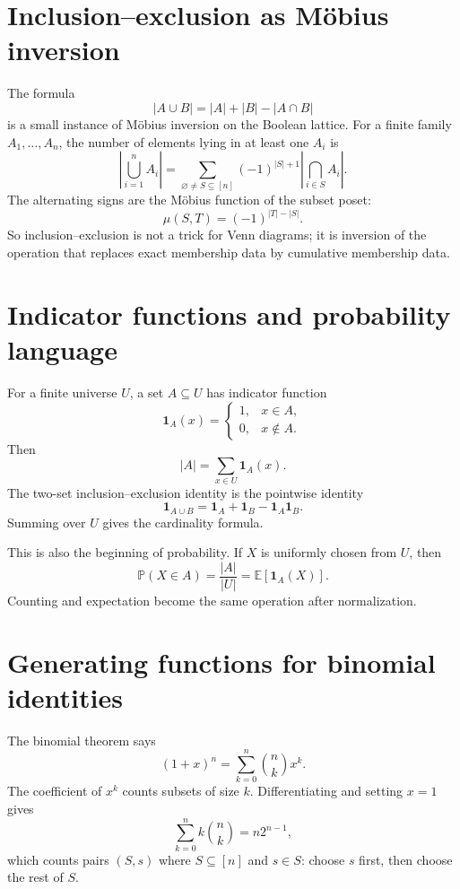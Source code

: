 \section{Inclusion--exclusion as Möbius inversion}

The formula
\[
  |A\cup B|=|A|+|B|-|A\cap B|
\]
is a small instance of Möbius inversion on the Boolean lattice.  For a finite family \(A_1,\ldots,A_n\), the number of elements lying in at least one \(A_i\) is
\[
  \left|\bigcup_{i=1}^n A_i\right|
  =\sum_{\varnothing\ne S\subseteq[n]}(-1)^{|S|+1}
  \left|\bigcap_{i\in S}A_i\right|.
\]
The alternating signs are the Möbius function of the subset poset:
\[
  \mu(S,T)=(-1)^{|T|-|S|}.
\]
So inclusion--exclusion is not a trick for Venn diagrams; it is inversion of the operation that replaces exact membership data by cumulative membership data.

\section{Indicator functions and probability language}

For a finite universe \(U\), a set \(A\subseteq U\) has indicator function
\[
  \mathbf 1_A(x)=
  \begin{cases}
  1,&x\in A,\\
  0,&x\notin A.
  \end{cases}
\]
Then
\[
  |A|=\sum_{x\in U}\mathbf 1_A(x).
\]
The two-set inclusion--exclusion identity is the pointwise identity
\[
  \mathbf 1_{A\cup B}=\mathbf 1_A+\mathbf 1_B-\mathbf 1_A\mathbf 1_B.
\]
Summing over \(U\) gives the cardinality formula.

This is also the beginning of probability.  If \(X\) is uniformly chosen from \(U\), then
\[
  \mathbb P(X\in A)=\frac{|A|}{|U|}=\mathbb E[\mathbf 1_A(X)].
\]
Counting and expectation become the same operation after normalization.

\section{Generating functions for binomial identities}

The binomial theorem says
\[
  (1+x)^n=\sum_{k=0}^n\binom nkx^k.
\]
The coefficient of \(x^k\) counts subsets of size \(k\).  Differentiating and setting \(x=1\) gives
\[
  \sum_{k=0}^n k\binom nk=n2^{n-1},
\]
which counts pairs \((S,s)\) where \(S\subseteq[n]\) and \(s\in S\): choose \(s\) first, then choose the rest of \(S\).

